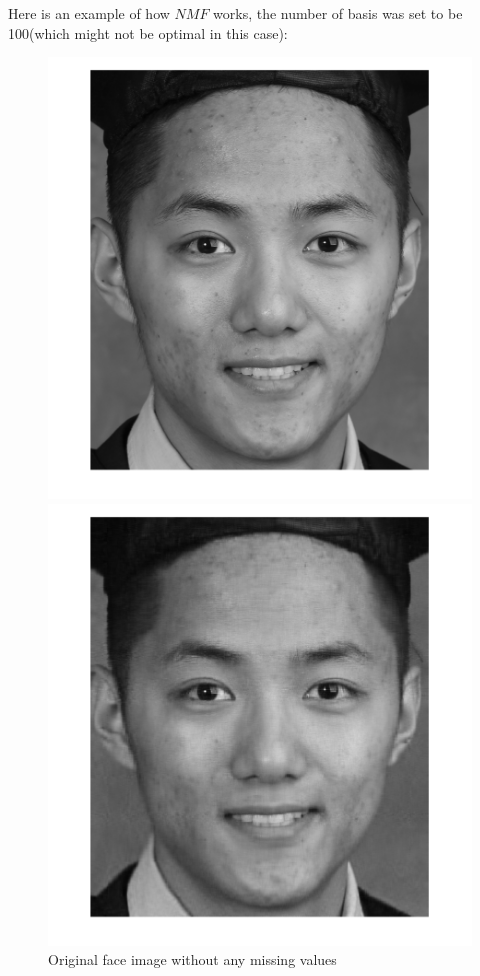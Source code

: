 \documentclass[11pt]{article} %
\begin{document}
Here is an example of how $NMF$ works, the number of basis was set to be 100(which might not be optimal in this case):
\begin{figure}[!htb]
  \includegraphics[width=\linewidth]{mySelfieOriginal.png}
  \caption{Original face image without any missing values}\label{fig:selfie1}
\endminipage\hfill
{}
  \includegraphics[width=\linewidth]{mySelfie50M100R.png}

\end{figure}
\end{document}

